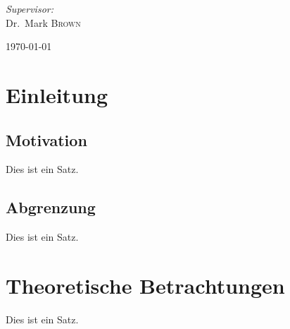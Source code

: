 \documentclass[a4paper, 11pt]{article}
\begin{document}
\begin{titlepage}
\begin{center}
\begin{minipage}{0.4\textwidth}
\begin{flushright}
					\emph{Supervisor:} \\

					Dr.~Mark \textsc{Brown}

				\end{flushright}

			\end{minipage}

			

			\vfill

			


			{\large \today}

			

		\end{center}

		

	\end{titlepage}






\tableofcontents




\newpage




\section{Einleitung}




\subsection{Motivation}



Dies ist ein Satz.




\subsection{Abgrenzung}



Dies ist ein Satz.




\newpage




\section{Theoretische Betrachtungen}



Dies ist ein Satz.



\end{document}
